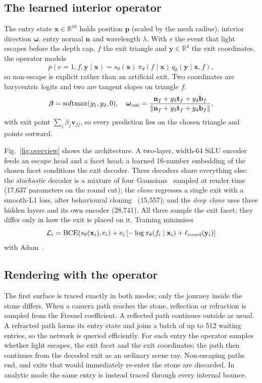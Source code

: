 \documentclass[conference]{IEEEtran}
\newcommand{\R}{\mathbb{R}}
\begin{document}
\subsection{The learned interior operator}
The entry state $\mathbf{x}\in\R^{10}$ holds position $\mathbf{p}$ (scaled by
the mesh radius), interior direction $\boldsymbol\omega$, entry normal
$\mathbf{n}$ and wavelength $\lambda$. With $e$ the event that light escapes
before the depth cap, $f$ the exit triangle and $\mathbf{y}\in\R^4$ the exit
coordinates, the operator models
\begin{equation}
 p(e=1,f,\mathbf{y}\mid\mathbf{x})=
 s_\theta(\mathbf{x})\,\pi_\theta(f\mid\mathbf{x})\,
 q_\theta(\mathbf{y}\mid\mathbf{x},f),
\end{equation}
so non-escape is explicit rather than an artificial exit. Two coordinates are
barycentric logits and two are tangent slopes on triangle $f$:
\begin{equation}
 \boldsymbol\beta=\operatorname{softmax}(y_1,y_2,0),\quad
 \boldsymbol\omega_{\rm out}=
 \frac{\mathbf{n}_f+y_3\mathbf{t}_f+y_4\mathbf{b}_f}
 {\|\mathbf{n}_f+y_3\mathbf{t}_f+y_4\mathbf{b}_f\|},
\end{equation}
with exit point $\sum_j\beta_j\mathbf{v}_{fj}$, so every prediction lies on the
chosen triangle and points outward.

Fig.~\ref{fig:overview} shows the architecture. A two-layer, width-64 SiLU
encoder~\cite{elfwing2018} feeds an escape head and a facet head; a learned
16-number embedding of the chosen facet conditions the exit decoder. Three
decoders share everything else: the \emph{stochastic} decoder is a mixture of
four Gaussians~\cite{bishop1994} sampled at render time (17,637 parameters on
the round cut); the \emph{clone} regresses a single exit with a smooth-L1 loss,
after behavioural cloning~\cite{pomerleau1989} (15,557); and the \emph{deep
clone} uses three hidden layers and its own encoder (28,741). All three sample
the exit facet; they differ only in how the exit is placed on it. Training
minimises
\begin{equation}
 \mathcal L_i=\operatorname{BCE}(s_\theta(\mathbf{x}_i),e_i)
 +e_i\left[-\log\pi_\theta(f_i\mid\mathbf{x}_i)
 +\ell_{\rm coord}(\mathbf{y}_i)\right]
\end{equation}
with Adam~\cite{kingma2015}.

\subsection{Rendering with the operator}
The first surface is traced exactly in both modes; only the journey inside the
stone differs. When a camera path reaches the stone, reflection or refraction is
sampled from the Fresnel coefficient. A reflected path continues outside as
usual. A refracted path forms its entry state and joins a batch of up to 512
waiting entries, so the network is queried efficiently. For each entry the
operator samples whether light escapes, the exit facet and the exit
coordinates; the path then continues from the decoded exit as an ordinary scene
ray. Non-escaping paths end, and exits that would immediately re-enter the stone
are discarded. In analytic mode the same entry is instead traced through every
internal bounce.
\end{document}
